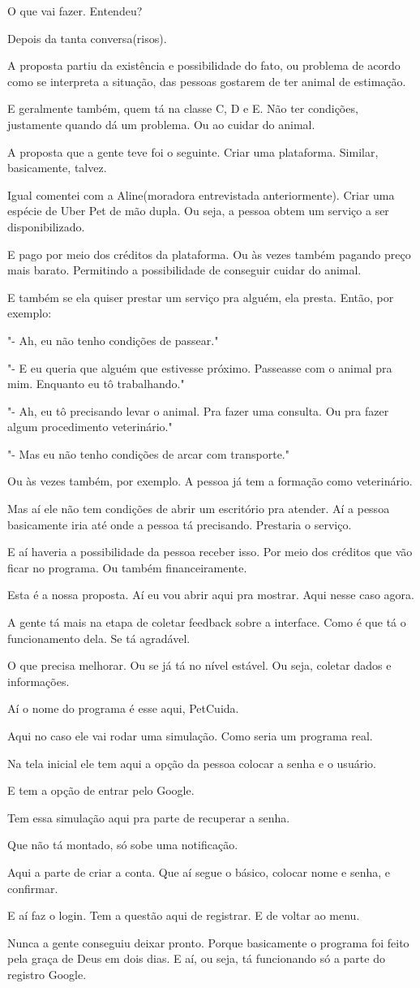 \documentclass[12pt,a4paper]{article}
\newenvironment{turnos}{\begin{list}{}{\setlength{\leftmargin}{2.2cm}\setlength{\labelwidth}{2.0cm}\setlength{\labelsep}{0.2cm}\setlength{\itemsep}{0.45em}\setlength{\parsep}{0pt}}}{\end{list}}
\newcommand{\fala}[1]{\item[\textbf{#1}\hfill]}
\begin{document}
\begin{turnos}
\fala{G:} O que vai fazer. Entendeu?
\fala{E:} Depois da tanta conversa(risos).
\fala{E:} A proposta partiu da existência e possibilidade do fato, ou problema de acordo como se interpreta a situação, das pessoas gostarem de ter animal de estimação.
\fala{E:} E geralmente também, quem tá na classe C, D e E. Não ter condições, justamente quando dá um problema. Ou ao cuidar do animal.
\fala{E:} A proposta que a gente teve foi o seguinte. Criar uma plataforma. Similar, basicamente, talvez.
\fala{E:} Igual comentei com a Aline(moradora entrevistada anteriormente). Criar uma espécie de Uber Pet de mão dupla. Ou seja, a pessoa obtem um serviço a ser disponibilizado.
\fala{E:} E pago por meio dos créditos da plataforma. Ou às vezes também pagando preço mais barato. Permitindo a possibilidade de conseguir cuidar do animal.
\fala{E:} E também se ela quiser prestar um serviço pra alguém, ela presta. Então, por exemplo: 
\fala{E:} "- Ah, eu não tenho condições de passear."
\fala{E:} "- E eu queria que alguém que estivesse próximo. Passeasse com o animal pra mim. Enquanto eu tô trabalhando."
\fala{E:} "- Ah, eu tô precisando levar o animal. Pra fazer uma consulta. Ou pra fazer algum procedimento veterinário."
\fala{E:} "- Mas eu não tenho condições de arcar com transporte."
\fala{E:} Ou às vezes também, por exemplo. A pessoa já tem a formação como veterinário.
\fala{E:} Mas aí ele não tem condições de abrir um escritório pra atender. Aí a pessoa basicamente iria até onde a pessoa tá precisando. Prestaria o serviço.
\fala{E:} E aí haveria a possibilidade da pessoa receber isso. Por meio dos créditos que vão ficar no programa. Ou também financeiramente.
\fala{E:} Esta é a nossa proposta. Aí eu vou abrir aqui pra mostrar. Aqui nesse caso agora.
\fala{E:} A gente tá mais na etapa de coletar feedback sobre a interface. Como é que tá o funcionamento dela. Se tá agradável.
\fala{E:} O que precisa melhorar. Ou se já tá no nível estável. Ou seja, coletar dados e informações.
\fala{E:} Aí o nome do programa é esse aqui, PetCuida. 
\fala{E:} Aqui no caso ele vai rodar uma simulação. Como seria um programa real.
\fala{E:} Na tela inicial ele tem aqui a opção da pessoa colocar a senha e o usuário. 
\fala{E:} E tem a opção de entrar pelo Google. 
\fala{E:} Tem essa simulação aqui pra parte de recuperar a senha.
\fala{E:} Que não tá montado, só sobe uma notificação. 
\fala{E:} Aqui a parte de criar a conta. Que aí segue o básico, colocar nome e senha, e confirmar.
\fala{E:} E aí faz o login. Tem a questão aqui de registrar. E de voltar ao menu.
\fala{E:} Nunca a gente conseguiu deixar pronto. Porque basicamente o programa foi feito pela graça de Deus em dois dias. E aí, ou seja, tá funcionando só a parte do registro Google.

\end{turnos}
\end{document}

